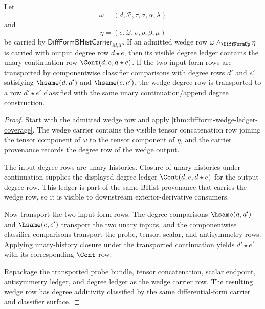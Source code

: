 \begin{theorem}
\label{thm:diffform-wedge-degree-additivity-ledger}
Let
$$
\omega=(d,\mathcal{P},\tau,\sigma,\alpha,\lambda)
$$
and
$$
\eta=(e,\mathcal{Q},\upsilon,\rho,\beta,\mu)
$$
be carried by $\mathsf{DiffFormBHistCarrier}_{M,T}$. If an admitted wedge row
$\omega\wedge_{\DiffFormUp}\eta$ is carried with output degree row $d\star e$,
then its visible degree ledger contains the unary continuation row
$\Cont(d,e,d\star e)$. If the two input form rows are transported by
componentwise classifier comparisons with degree rows $d'$ and $e'$ satisfying
$\hsame(d,d')$ and $\hsame(e,e')$, the wedge degree row is transported to a row
$d'\star e'$ classified with the same unary continuation/append degree
construction.
\end{theorem}
\begin{proof}
Start with the admitted wedge row and apply
\autoref{thm:diffform-wedge-ledger-coverage}. The wedge carrier contains the
visible tensor concatenation row joining the tensor component of $\omega$ to
the tensor component of $\eta$, and the carrier provenance records the degree
row of the wedge output.

The input degree rows are unary histories. Closure of unary histories under
continuation supplies the displayed degree ledger
$\Cont(d,e,d\star e)$ for the output degree row. This ledger is part of the
same BHist provenance that carries the wedge row, so it is visible to
downstream exterior-derivative consumers.

Now transport the two input form rows. The degree comparisons
$\hsame(d,d')$ and $\hsame(e,e')$ transport the two unary inputs, and the
componentwise classifier comparisons transport the probe, tensor, scalar, and
antisymmetry rows. Applying unary-history closure under the transported
continuation yields $d'\star e'$ with its corresponding $\Cont$ row.

Repackage the transported probe bundle, tensor concatenation, scalar endpoint,
antisymmetry ledger, and degree ledger as the wedge carrier row. The resulting
wedge row has degree additivity classified by the same differential-form
carrier and classifier surface.
\end{proof}

